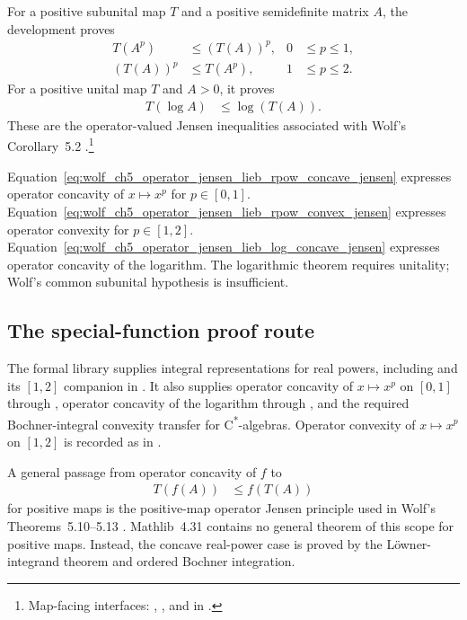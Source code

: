 \documentclass{article}
\begin{document}
For a positive subunital map $T$ and a positive semidefinite matrix $A$, the
development proves
\begin{align}
    T(A^p)&\leq(T(A))^p,
    &
    0&\leq p\leq 1,
    \label{eq:wolf_ch5_operator_jensen_lieb_rpow_concave_jensen}\\
    (T(A))^p&\leq T(A^p),
    &
    1&\leq p\leq 2.
    \label{eq:wolf_ch5_operator_jensen_lieb_rpow_convex_jensen}
\end{align}
For a positive unital map $T$ and $A>0$, it proves
\begin{align}
    T(\log A)&\leq\log(T(A)).
    \label{eq:wolf_ch5_operator_jensen_lieb_log_concave_jensen}
\end{align}
These are the operator-valued Jensen inequalities associated with Wolf's
Corollary~5.2 \cite[Corollary~5.2]{Wolf2012Quantum}.\footnote{Map-facing
interfaces:
,
, and
 in
.}

Equation~\ref{eq:wolf_ch5_operator_jensen_lieb_rpow_concave_jensen} expresses
operator concavity of $x\mapsto x^p$ for $p\in[0,1]$.
Equation~\ref{eq:wolf_ch5_operator_jensen_lieb_rpow_convex_jensen} expresses
operator convexity for $p\in[1,2]$.
Equation~\ref{eq:wolf_ch5_operator_jensen_lieb_log_concave_jensen} expresses
operator concavity of the logarithm. The logarithmic theorem requires
unitality; Wolf's common subunital hypothesis is insufficient.

\subsection{The special-function proof route}

The formal library supplies integral representations for real powers, including
 and its
$[1,2]$ companion in
.
It also supplies operator concavity of $x\mapsto x^p$ on $[0,1]$ through
, operator concavity of the logarithm through
, and the required Bochner-integral convexity
transfer for C\textsuperscript{*}-algebras. Operator convexity of
$x\mapsto x^p$ on $[1,2]$ is recorded as  in
.

A general passage from operator concavity of $f$ to
\begin{align}
    T(f(A))&\leq f(T(A))
    \label{eq:wolf_ch5_operator_jensen_lieb_general_concave_jensen_form}
\end{align}
for positive maps is the positive-map operator Jensen principle used in
Wolf's Theorems~5.10--5.13 \cite[Theorems~5.10--5.13]{Wolf2012Quantum}.
Mathlib~4.31 contains no general theorem of this scope for positive maps.
Instead, the concave real-power case is proved by the L\"owner-integrand
theorem
 and ordered
Bochner integration.
\end{document}
